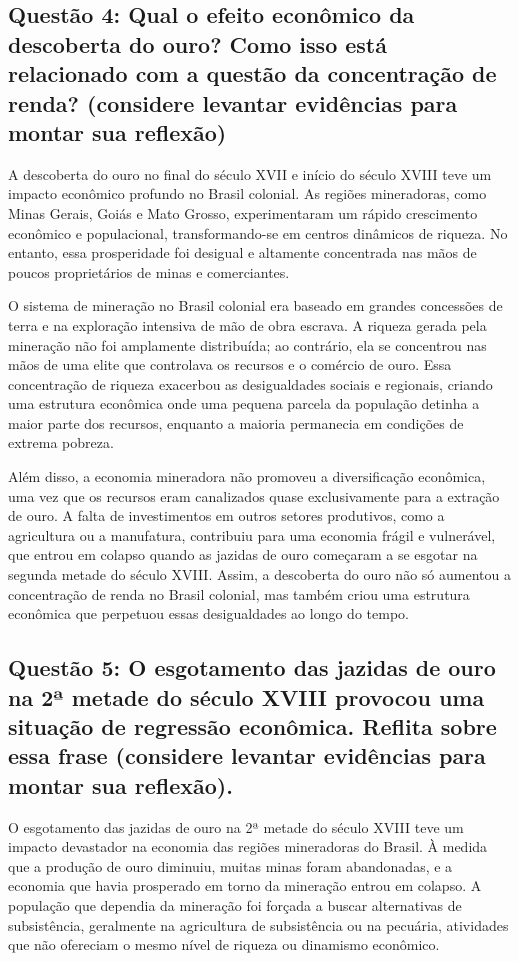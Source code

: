 \documentclass[a4paper,12pt]{article}[abntex2]
\begin{document}
\subsection{\textbf{Questão 4: Qual o efeito econômico da descoberta do ouro? Como isso está relacionado com a questão da concentração de renda? (considere levantar evidências para montar sua reflexão)}}

A descoberta do ouro no final do século XVII e início do século XVIII teve um impacto econômico profundo no Brasil colonial. As regiões mineradoras, como Minas Gerais, Goiás e Mato Grosso, experimentaram um rápido crescimento econômico e populacional, transformando-se em centros dinâmicos de riqueza. No entanto, essa prosperidade foi desigual e altamente concentrada nas mãos de poucos proprietários de minas e comerciantes.

O sistema de mineração no Brasil colonial era baseado em grandes concessões de terra e na exploração intensiva de mão de obra escrava. A riqueza gerada pela mineração não foi amplamente distribuída; ao contrário, ela se concentrou nas mãos de uma elite que controlava os recursos e o comércio de ouro. Essa concentração de riqueza exacerbou as desigualdades sociais e regionais, criando uma estrutura econômica onde uma pequena parcela da população detinha a maior parte dos recursos, enquanto a maioria permanecia em condições de extrema pobreza.

Além disso, a economia mineradora não promoveu a diversificação econômica, uma vez que os recursos eram canalizados quase exclusivamente para a extração de ouro. A falta de investimentos em outros setores produtivos, como a agricultura ou a manufatura, contribuiu para uma economia frágil e vulnerável, que entrou em colapso quando as jazidas de ouro começaram a se esgotar na segunda metade do século XVIII. Assim, a descoberta do ouro não só aumentou a concentração de renda no Brasil colonial, mas também criou uma estrutura econômica que perpetuou essas desigualdades ao longo do tempo.

\subsection{\textbf{Questão 5: O esgotamento das jazidas de ouro na 2ª metade do século XVIII provocou uma situação de regressão econômica. Reflita sobre essa frase (considere levantar evidências para montar sua reflexão).}}

O esgotamento das jazidas de ouro na 2ª metade do século XVIII teve um impacto devastador na economia das regiões mineradoras do Brasil. À medida que a produção de ouro diminuiu, muitas minas foram abandonadas, e a economia que havia prosperado em torno da mineração entrou em colapso. A população que dependia da mineração foi forçada a buscar alternativas de subsistência, geralmente na agricultura de subsistência ou na pecuária, atividades que não ofereciam o mesmo nível de riqueza ou dinamismo econômico.
\end{document}
